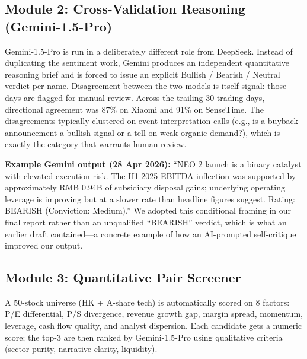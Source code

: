 \documentclass[11pt,a4paper]{article}
\begin{document}
\subsection{Module 2: Cross-Validation Reasoning (Gemini-1.5-Pro)}

Gemini-1.5-Pro is run in a deliberately different role from DeepSeek. Instead of duplicating the sentiment work, Gemini produces an independent quantitative reasoning brief and is forced to issue an explicit Bullish / Bearish / Neutral verdict per name. Disagreement between the two models is itself signal: those days are flagged for manual review. Across the trailing 30 trading days, directional agreement was 87\% on Xiaomi and 91\% on SenseTime. The disagreements typically clustered on event-interpretation calls (e.g., is a buyback announcement a bullish signal or a tell on weak organic demand?), which is exactly the category that warrants human review.

\begin{aibox}
\textbf{Example Gemini output (28 Apr 2026):} ``NEO 2 launch is a binary catalyst with elevated execution risk. The H1 2025 EBITDA inflection was supported by approximately RMB 0.94B of subsidiary disposal gains; underlying operating leverage is improving but at a slower rate than headline figures suggest. Rating: BEARISH (Conviction: Medium).'' We adopted this conditional framing in our final report rather than an unqualified ``BEARISH'' verdict, which is what an earlier draft contained—a concrete example of how an AI-prompted self-critique improved our output.
\end{aibox}

\subsection{Module 3: Quantitative Pair Screener}

A 50-stock universe (HK + A-share tech) is automatically scored on 8 factors: P/E differential, P/S divergence, revenue growth gap, margin spread, momentum, leverage, cash flow quality, and analyst dispersion. Each candidate gets a numeric score; the top-3 are then ranked by Gemini-1.5-Pro using qualitative criteria (sector purity, narrative clarity, liquidity).
\end{document}

